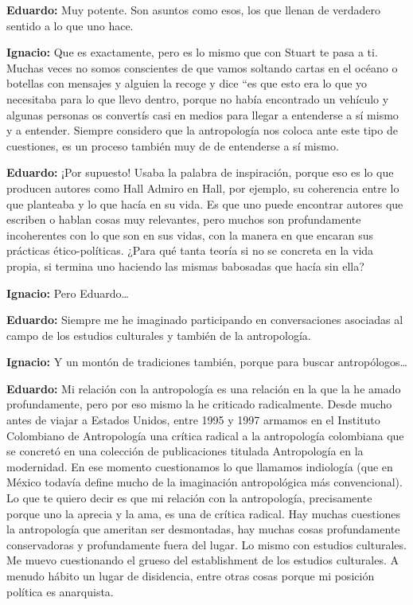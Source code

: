 \documentclass[
]{interact}
\begin{document}
\textbf{Eduardo:} Muy potente. Son asuntos como esos, los que llenan de
verdadero sentido a lo que uno hace.

\textbf{Ignacio:} Que es exactamente, pero es lo mismo que con Stuart te
pasa a ti. Muchas veces no somos conscientes de que vamos soltando
cartas en el océano o botellas con mensajes y alguien la recoge y dice
``es que esto era lo que yo necesitaba para lo que llevo dentro, porque
no había encontrado un vehículo y algunas personas os convertís casi en
medios para llegar a entenderse a sí mismo y a entender. Siempre
considero que la antropología nos coloca ante este tipo de cuestiones,
es un proceso también muy de de entenderse a sí mismo.

\textbf{Eduardo:} ¡Por supuesto! Usaba la palabra de inspiración, porque
eso es lo que producen autores como Hall Admiro en Hall, por ejemplo, su
coherencia entre lo que planteaba y lo que hacía en su vida. Es que uno
puede encontrar autores que escriben o hablan cosas muy relevantes, pero
muchos son profundamente incoherentes con lo que son en sus vidas, con
la manera en que encaran sus prácticas ético-políticas. ¿Para qué tanta
teoría si no se concreta en la vida propia, si termina uno haciendo las
mismas babosadas que hacía sin ella?

\textbf{Ignacio:} Pero Eduardo\ldots{}

\textbf{Eduardo:} Siempre me he imaginado participando en conversaciones
asociadas al campo de los estudios culturales y también de la
antropología.

\textbf{Ignacio:} Y un montón de tradiciones también, porque para buscar
antropólogos\ldots{}

\textbf{Eduardo:} Mi relación con la antropología es una relación en la
que la he amado profundamente, pero por eso mismo la he criticado
radicalmente. Desde mucho antes de viajar a Estados Unidos, entre 1995 y
1997 armamos en el Instituto Colombiano de Antropología una crítica
radical a la antropología colombiana que se concretó en una colección de
publicaciones titulada Antropología en la modernidad. En ese momento
cuestionamos lo que llamamos indiología (que en México todavía define
mucho de la imaginación antropológica más convencional). Lo que te
quiero decir es que mi relación con la antropología, precisamente porque
uno la aprecia y la ama, es una de crítica radical. Hay muchas
cuestiones la antropología que ameritan ser desmontadas, hay muchas
cosas profundamente conservadoras y profundamente fuera del lugar. Lo
mismo con estudios culturales. Me muevo cuestionando el grueso del
establishment de los estudios culturales. A menudo hábito un lugar de
disidencia, entre otras cosas porque mi posición política es anarquista.
\end{document}
